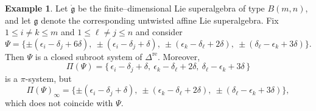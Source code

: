 \documentclass[11pt,reqno]{amsart}
\theoremstyle{plain}
\theoremstyle{definition}
\newtheorem*{example}{Example}
\theoremstyle{remark}
\numberwithin{equation}{section}
\begin{document}
\begin{example}\label{thenonexample2}
    Let $\mathring{\mathfrak{g}}$ be the finite--dimensional Lie superalgebra of type $B(m,n)$, 
and let $\mathfrak{g}$ denote the corresponding untwisted affine Lie superalgebra. Fix $1\le i\neq k\le m$ and $1\le \ell \neq j\le n$ and consider
$$\Psi=\{\pm(\epsilon_i-\delta_j+6\delta),\ \pm(\epsilon_i-\delta_j+\delta),\ \pm(\epsilon_k-\delta_\ell+2\delta),\ \pm(\delta_\ell-\epsilon_k+3\delta)\}.$$
Then $\Psi$ is a closed subroot system of 
$\Delta^{\mathrm{re}}$. Moreover,
$$\Pi(\Psi)=\{\,\epsilon_i-\delta_j+\delta,\ \epsilon_k-\delta_\ell+2\delta,\ \delta_\ell-\epsilon_k+3\delta\,\}$$
is a $\pi$-system, but 
$$\Pi(\Psi)_{\infty}=\{\pm(\epsilon_i-\delta_j+\delta),\ \pm(\epsilon_k-\delta_\ell+2\delta),\ \pm(\delta_\ell-\epsilon_k+3\delta)\},$$
which does not coincide with $\Psi$.
\end{example}
\end{document}
